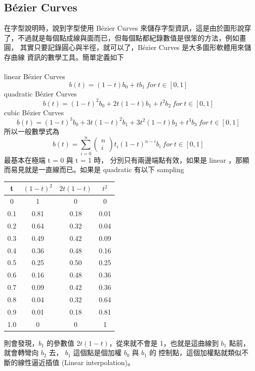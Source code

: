   \subsection{Bézier Curves}
  在字型說明時，說到字型使用 Bézier Curves 來儲存字型資訊，這是由於圖形說穿
  了，不過就是每個點成線與面而已，但每個點都紀錄數值是很笨的方法，例如畫圓，
  其實只要記錄圓心與半徑，就可以了，Bézier Curves 是大多圖形軟體用來儲存曲線
  資訊的數學工具。簡單定義如下
  \\\\
  linear Bézier Curves
  \[ b(t) = (1−t)b_{0} + tb_{1} ~ for ~ t \in [0, 1] \]
  quadratic Bézier Curves
  \[ b(t) = (1−t)^{2}b_{0} + 2t(1−t)b_{1} + t^{2}b_{2} ~ for ~ t \in [0, 1]\]
  cubic Bézier Curves
  \[ b(t) = (1−t)^{3}b_{0} + 3t(1−t)^{2}b_{1} + 3t^{2}(1−t)b_{2} + t^{3}b_{3} ~ for ~ t \in [0, 1] \]
  所以一般數學式為
  \[
    b(t)
    = \sum_{i=0}^{n}
      \left( \begin{array}{c} n \\ i \end{array} \right)
      t_{i}(1 − t)^{n−i}b_{i}
      ~ for ~ t \in [0, 1]
  \]
  最基本在極端 t = 0 與 t = 1 時， 分別只有兩邊端點有效，如果是 linear ，那顯
  而易見就是一直線而已。如果是 quadratic 有以下 sampling
  \begin{center}
    \begin{tabular}{c|ccc}
      t & $(1−t)^{2}$ & $2t(1−t)$ & $t^{2}$\\
      \hline
      0 & 1 & 0 & 0 \\
      0.1 & 0.81 & 0.18 & 0.01\\
      0.2 & 0.64 & 0.32 & 0.04\\
      0.3 & 0.49 & 0.42 & 0.09\\
      0.4 & 0.36 & 0.48 & 0.16\\
      0.5 & 0.25 & 0.50 & 0.25\\
      0.6 & 0.16 & 0.48 & 0.36\\
      0.7 & 0.09 & 0.42 & 0.36\\
      0.8 & 0.04 & 0.32 & 0.64\\
      0.9 & 0.01 & 0.18 & 0.81\\
      1.0 & 0 & 0 & 1
    \end{tabular}
  \end{center}
  則會發現，$b_{1}$ 的參數值 $2t(1−t)$，從來就不會是 1，也就是這曲線到 $b_{1}$
  點前，就會轉彎向 $b_{2}$ 去， $b_{1}$ 這個點是個加權 $b_{0}$ 與 $b_{1}$ 的
  控制點，這個加權點就類似不斷的線性逼近插值 (Linear interpolation)。

